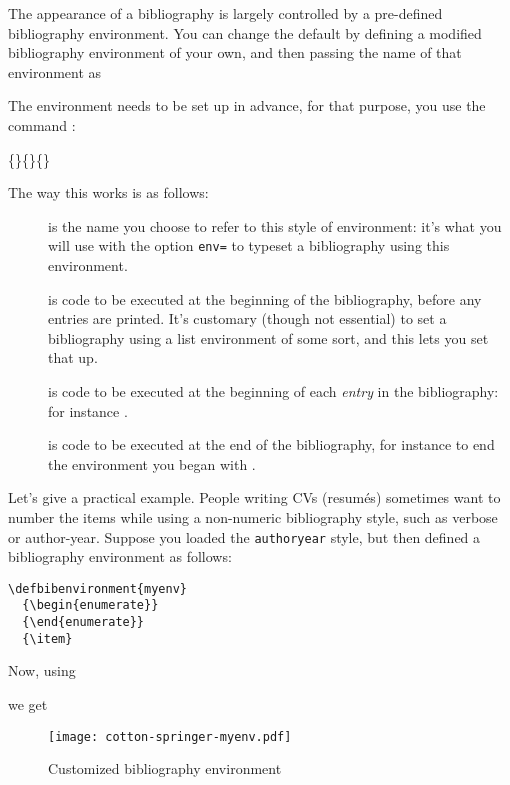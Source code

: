 The appearance of a bibliography is largely controlled by a
pre-defined bibliography environment. You can change the default by
defining a modified bibliography environment of your own, and then
passing the name of that environment as
\begin{center}
\end{center}

The environment needs to be set up in advance, for that purpose, you
use the command :
\begin{center}
\ttfamily
{}\{\}\{\}\{\}
\end{center}

The way this works is as follows:
\begin{description}
\item[] is the name you choose to refer to this style of
  environment: it's what you will use with the option \texttt{env=} to
  typeset a bibliography using this environment.
\item[] is code to be executed at the beginning of the
  bibliography, before any entries are printed. It's customary (though
  not essential) to set a bibliography using a list environment of
  some sort, and this lets you set that up.
\item[] is code to be executed at the beginning of each
  \emph{entry} in the bibliography: for instance .
\item[] is code to be executed at the end of the
  bibliography, for instance to end the environment you began with
  .
\end{description}

Let's give a practical example. People writing CVs (resum\'es)
sometimes want to number the items while using a non-numeric
bibliography style, such as verbose or author-year. Suppose you loaded
the \verb|authoryear| style, but then defined a bibliography
environment as follows:
\begin{verbatim}
\defbibenvironment{myenv}
  {\begin{enumerate}}
  {\end{enumerate}}
  {\item}
\end{verbatim}
Now, using
\begin{pseudoverb}
\relax[env=myenv,heading=myheading]
\end{pseudoverb}
we get

\begin{figure}
\texttt{[image: cotton-springer-myenv.pdf]}
\caption{Customized bibliography environment\label{custom-env}}
\end{figure}
